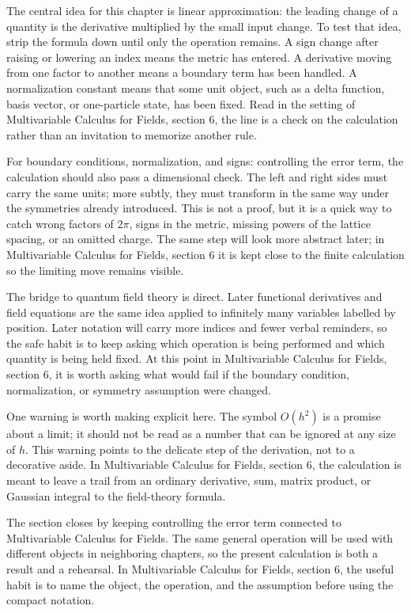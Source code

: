 The central idea for this chapter is linear approximation: the leading change of a quantity is the derivative multiplied by the small input change.  To test that idea, strip the formula down until only the operation remains.  A sign change after raising or lowering an index means the metric has entered.  A derivative moving from one factor to another means a boundary term has been handled.  A normalization constant means that some unit object, such as a delta function, basis vector, or one-particle state, has been fixed.  Read in the setting of Multivariable Calculus for Fields, section 6, the line is a check on the calculation rather than an invitation to memorize another rule.

For boundary conditions, normalization, and signs: controlling the error term, the calculation should also pass a dimensional check.  The left and right sides must carry the same units; more subtly, they must transform in the same way under the symmetries already introduced.  This is not a proof, but it is a quick way to catch wrong factors of \(2\pi\), signs in the metric, missing powers of the lattice spacing, or an omitted charge.  The same step will look more abstract later; in Multivariable Calculus for Fields, section 6 it is kept close to the finite calculation so the limiting move remains visible.

The bridge to quantum field theory is direct.  Later functional derivatives and field equations are the same idea applied to infinitely many variables labelled by position.  Later notation will carry more indices and fewer verbal reminders, so the safe habit is to keep asking which operation is being performed and which quantity is being held fixed.  At this point in Multivariable Calculus for Fields, section 6, it is worth asking what would fail if the boundary condition, normalization, or symmetry assumption were changed.

One warning is worth making explicit here.  The symbol \(O(h^2)\) is a promise about a limit; it should not be read as a number that can be ignored at any size of \(h\).  This warning points to the delicate step of the derivation, not to a decorative aside.  In Multivariable Calculus for Fields, section 6, the calculation is meant to leave a trail from an ordinary derivative, sum, matrix product, or Gaussian integral to the field-theory formula.

The section closes by keeping controlling the error term connected to Multivariable Calculus for Fields.  The same general operation will be used with different objects in neighboring chapters, so the present calculation is both a result and a rehearsal.  In Multivariable Calculus for Fields, section 6, the useful habit is to name the object, the operation, and the assumption before using the compact notation.




